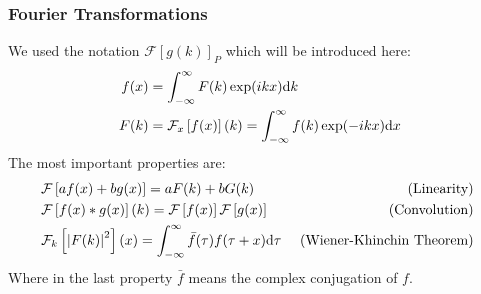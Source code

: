 \subsubsection{Fourier Transformations}
We used the notation  $\mathcal{F} \left[g(k)\right ]_P$ which will be introduced here:
\begin{align}
f(x) &= \int_{-\infty}^{\infty} F(k)\exp(i kx)\mathrm{d} k\\
F(k) &= \mathcal{F}_x\left [f(x)\right ](k) =
\int_{-\infty}^{\infty} f(k)\exp(-i kx) \mathrm{d} x
\end{align}
The most important properties are:
\begin{align}
    \label{eq:fourier}
&\mathcal{F}\left [a f(x) + b g(x)\right ]
    = a F(k) + b G(k) 
    &\mbox{ (Linearity) }\\
&\mathcal{F}\left [f(x) * g(x)\right ](k)
    = \mathcal{F}\left [f(x)\right ]\mathcal{F}\left [g(x)\right ]
    \! &\mbox{ (Convolution) }\\
&\mathcal{F}_k\left [\left | F(k) \right |^2\right ](x)
   =  \int_{-\infty}^{\infty}\bar{f}(\tau)f(\tau + x) \mathrm{d}\tau 
   &\mbox{ (Wiener-Khinchin Theorem) }
\end{align}
Where in the last property $\bar{f}$ means the complex conjugation of $f$.

